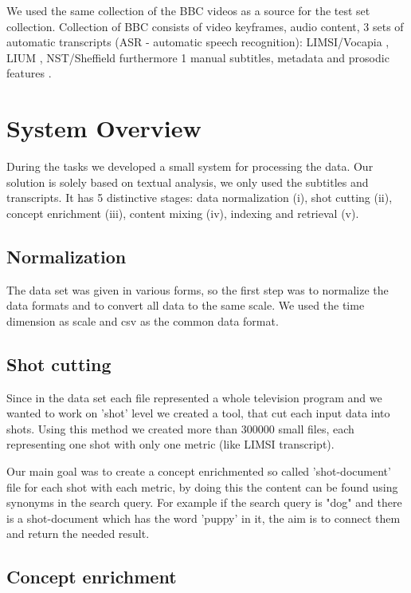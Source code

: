\documentclass{acm_proc_article-me}
\begin{document}
We used the same collection of the BBC videos as a source for the test set collection. Collection of BBC consists of video keyframes, audio content, 3 sets of automatic transcripts (ASR - automatic speech recognition): LIMSI/Vocapia \cite{gauvain2002limsi,lamel2012multilingual,lamel2008speech}, LIUM , NST/Sheffield \cite{lanchantin2013automatic,hain2008automatic} furthermore 1 manual subtitles, metadata and prosodic features \cite{eyben2013recent}.


\section{System Overview}

During the tasks we developed a small system for processing the data. Our solution is solely based on textual analysis, we only used the subtitles and transcripts. It has 5 distinctive stages: data normalization (i), shot cutting (ii), concept enrichment (iii), content mixing (iv), indexing and retrieval (v).


\subsection{Normalization}
The data set was given in various forms, so the first step was to normalize the data formats and to convert all data to the same scale. We used the time dimension as scale and csv as the common data format.

\subsection{Shot cutting}

Since in the data set each file represented a whole television program and we wanted to work on 'shot' level we created a tool, that cut each input data into shots. Using this method we created more than 300000 small files, each representing one shot with only one metric (like LIMSI transcript).

Our main goal was to create a concept enrichmented so called 'shot-document' file for each shot with each metric, by doing this the content can be found using synonyms in the search query. For example if the search query is "dog" and there is a shot-document which has the word 'puppy' in it, the aim is to connect them and return the needed result.

\subsection{Concept enrichment}
\end{document}
